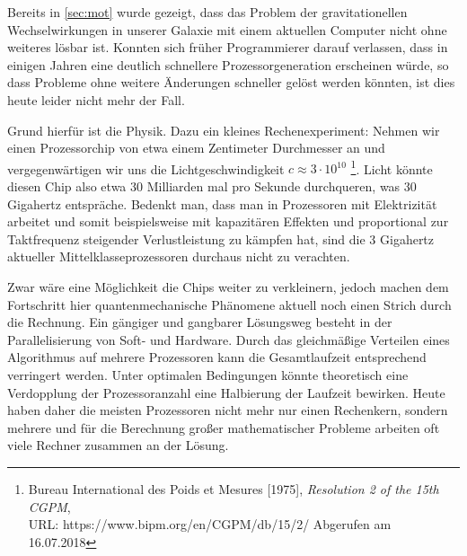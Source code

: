 Bereits in \autoref{sec:mot} wurde gezeigt, dass das Problem der gravitationellen Wechselwirkungen in unserer Galaxie mit einem aktuellen Computer nicht ohne 
    weiteres lösbar ist. 
    Konnten sich früher Programmierer darauf verlassen, dass in einigen Jahren eine deutlich schnellere Prozessorgeneration erscheinen würde, so dass Probleme ohne 
    weitere Änderungen schneller gelöst werden könnten, ist dies heute leider nicht mehr der Fall. 
    
    Grund hierfür ist die Physik. Dazu ein kleines Rechenexperiment: Nehmen wir einen Prozessorchip von etwa einem Zentimeter Durchmesser an und vergegenwärtigen wir 
    uns die Lichtgeschwindigkeit $c \approx 3\cdot10^{10}$ \footnote{Bureau International des Poids et Mesures [1975], \textit{Resolution 2 of the 15th CGPM},\\URL:
    https://www.bipm.org/en/CGPM/db/15/2/ Abgerufen am 16.07.2018}. Licht könnte diesen Chip also etwa 30 Milliarden mal pro Sekunde durchqueren, was 30 Gigahertz
    entspräche. Bedenkt man, dass man in Prozessoren mit Elektrizität arbeitet und somit beispielsweise mit kapazitären Effekten und proportional zur Taktfrequenz steigender
    Verlustleistung zu kämpfen hat, sind die 3 Gigahertz aktueller Mittelklasseprozessoren durchaus nicht zu verachten.
    
    Zwar wäre eine Möglichkeit die Chips weiter zu verkleinern, jedoch machen dem Fortschritt hier quantenmechanische Phänomene aktuell noch einen Strich durch die Rechnung.
    Ein gängiger und gangbarer Lösungsweg besteht in der Parallelisierung von Soft- und Hardware. Durch das gleichmäßige Verteilen eines Algorithmus auf mehrere Prozessoren
    kann die Gesamtlaufzeit entsprechend verringert werden. Unter optimalen Bedingungen könnte theoretisch eine Verdopplung der Prozessoranzahl eine Halbierung der Laufzeit
    bewirken. Heute haben daher die meisten Prozessoren nicht mehr nur einen Rechenkern, sondern mehrere und für die Berechnung großer mathematischer Probleme arbeiten oft viele
    Rechner zusammen an der Lösung. \citep{hpcskript}
    
